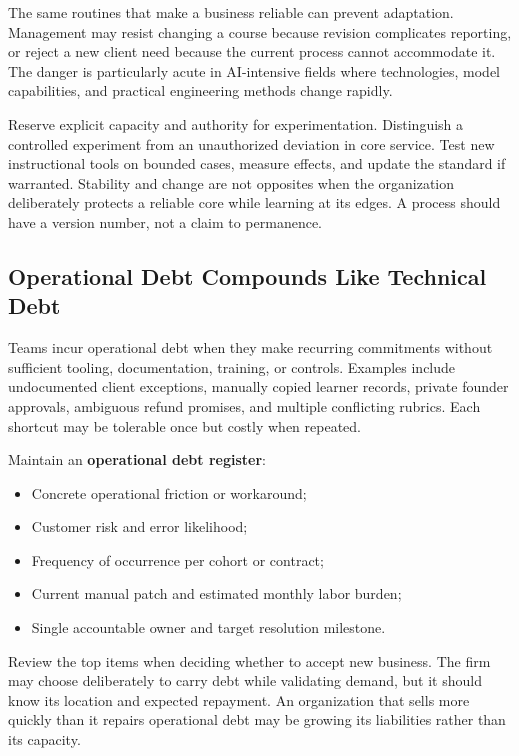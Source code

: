 The same routines that make a business reliable can prevent adaptation. Management may resist changing a course because revision complicates reporting, or reject a new client need because the current process cannot accommodate it. The danger is particularly acute in AI-intensive fields where technologies, model capabilities, and practical engineering methods change rapidly.

Reserve explicit capacity and authority for experimentation. Distinguish a controlled experiment from an unauthorized deviation in core service. Test new instructional tools on bounded cases, measure effects, and update the standard if warranted. Stability and change are not opposites when the organization deliberately protects a reliable core while learning at its edges. A process should have a version number, not a claim to permanence.

\subsection{Operational Debt Compounds Like Technical Debt}
\label{sec:operational_debt}

Teams incur operational debt when they make recurring commitments without sufficient tooling, documentation, training, or controls. Examples include undocumented client exceptions, manually copied learner records, private founder approvals, ambiguous refund promises, and multiple conflicting rubrics. Each shortcut may be tolerable once but costly when repeated.

Maintain an \textbf{operational debt register}:
\begin{itemize}
    \item Concrete operational friction or workaround;
    \item Customer risk and error likelihood;
    \item Frequency of occurrence per cohort or contract;
    \item Current manual patch and estimated monthly labor burden;
    \item Single accountable owner and target resolution milestone.
\end{itemize}

Review the top items when deciding whether to accept new business. The firm may choose deliberately to carry debt while validating demand, but it should know its location and expected repayment. An organization that sells more quickly than it repairs operational debt may be growing its liabilities rather than its capacity.

